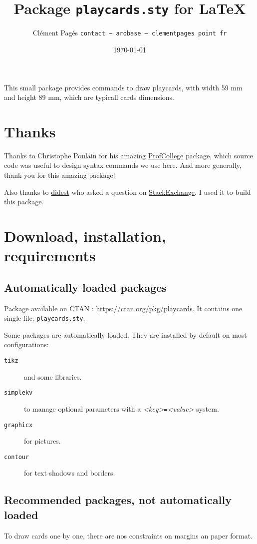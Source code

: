 \documentclass[a4paper, 12pt]{article}
\title{Package \texttt{playcards.sty} for \LaTeX}
\date{\today}
\author{Clément Pagès \texttt{contact -- arobase -- clementpages point fr}}
\newcommand{\package}[1]{\texttt{#1}}
\newcommand{\kv}[2]{\textit{<#1>}\texttt=\textit{<#2>}}
\begin{document}
\maketitle

This small package provides commands to draw playcards, with width 59 mm and height 89 mm, which are typicall cards dimensions.

\tableofcontents
\section*{Thanks}
Thanks to Christophe Poulain for his amazing \href{https://ctan.org/pkg/profcollege}{ProfCollege} package, which source code was useful to design syntax commands we use here. And more generally, thank you for this amazing package!

Also thanks to \href{https://tex.stackexchange.com/users/1948/didest}{didest} who asked a question on \href{https://tex.stackexchange.com/questions/47924/creating-playing-cards-using-tikz}{StackExchange}. I used it to build this package.

\section{Download, installation, requirements}
	\subsection{Automatically loaded packages}
Package available on CTAN : \url{https://ctan.org/pkg/playcards}. It contains one single file: \texttt{playcards.sty}.

Some packages are automatically loaded. They are installed by default on most configurations:
\begin{description}
	\item[\package{tikz}] and some libraries.
	\item[\package{simplekv}] to manage optional parameters with a \kv{key}{value} system.
	\item[\package{graphicx}] for pictures. 
	\item[\package{contour}] for text shadows and borders.
\end{description}


	\subsection{Recommended packages, not automatically loaded}
To draw cards one by one, there are nos constraints on margins an paper format.
\end{document}
